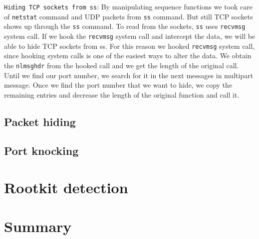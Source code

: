 \documentclass[10pt, letterpaper]{scrartcl}
\begin{document}
\texttt{Hiding TCP sockets from ss}: By manipulating sequence functions we took care of \texttt{netstat} 
command and UDP packets from \texttt{ss} command. But still TCP sockets shows up through the \texttt{ss} command.
To read from the sockets, \texttt{ss} uses \texttt{recvmsg} system call. 
If we hook the \texttt{recvmsg} system call and intercept the data, we will be able to hide TCP sockets from ss. 
For this reason we hooked \texttt{recvmsg} system call, 
since hooking system calls is one of the easiest ways to alter the data.
We obtain the \texttt{nlmsghdr} from the hooked call and we get the length of the original call.
Until we find our port number, we search for it in the next messages in multipart message. 
Once we find the port number that we want to hide, 
we copy the remaining entries and decrease the length of the original function and call it.


\subsection{Packet hiding}


\subsection{Port knocking}


\section{Rootkit detection}

\section{Summary}
\end{document}
